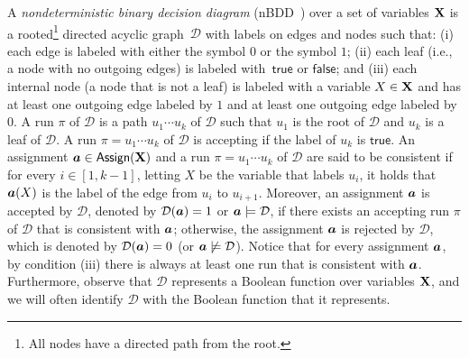 \newcommand{\true}{\mathsf{true}}
\newcommand{\false}{\mathsf{false}}
\newcommand{\D}{\mathcal{D}}

\newcommand{\nbdd}{\textsf{nBDD}\xspace}
\newcommand{\ubdd}{\textsf{uBDD}\xspace}
\newcommand{\bdd}{\textsf{BDD}\xspace}

\newcommand{\nfbdd}{\textsf{nFBDD}\xspace}
\newcommand{\nobdd}{\textsf{nOBDD}\xspace}

\newcommand{\ndt}{\textsf{nDT}\xspace}

\newcommand{\ufbdd}{\textsf{uFBDD}\xspace}
\newcommand{\uobdd}{\textsf{uOBDD}\xspace}

\newcommand{\fbdd}{\textsf{FBDD}\xspace}
\newcommand{\obdd}{\textsf{OBDD}\xspace}

\newcommand{\udt}{\textsf{uDT}\xspace}
\newcommand{\ddt}{\textsf{DT}\xspace}

\newcommand{\nodt}{\textsf{nODT}\xspace}
\newcommand{\uodt}{\textsf{uODT}\xspace}
\newcommand{\odt}{\textsf{ODT}\xspace}




A \emph{nondeterministic binary decision
diagram} (\nbdd~\citep{BW97,ACMS20}) over  a
set of variables $\mathbf{X}$ is a rooted\footnote{All nodes have a directed path from the root.} directed
acyclic graph~$\D$ with labels on edges and
nodes such that: (i) each
edge is labeled with either the symbol $0$ or
the symbol $1$; (ii) each leaf (i.e., a node
with no outgoing edges) is labeled
with~$\true$ or $\false$; and (iii) each internal
node (a node that is not a leaf) is labeled
with a variable $X \in \mathbf{X}$ and has at least one outgoing edge labeled by $1$ and at least one outgoing edge labeled by $0$. A run $\pi$ of $\D$ is a path
$u_1 \cdots u_k$ of $\D$ such that $u_1$ is
the root of $\D$ and $u_k$ is a leaf of $\D$.
A run $\pi = u_1 \cdots u_k$ of $\D$ is
accepting if the label of $u_k$ is $\true$. An
assignment $\boldsymbol{a} \in \mathsf{Assign}(\mathbf{X})$ and a run
$\pi = u_1 \cdots u_k$ of $\D$ are said to be
consistent if for every $i \in [1, k-1]$, letting $X$ be the variable that labels $u_i$, it
holds that $\boldsymbol{a}(X)$ is the label of the edge
from $u_i$ to $u_{i+1}$. Moreover, an
assignment $\boldsymbol{a}$ is accepted by $\D$, denoted
by $\D(\as) = 1$ or $\as \models \D$, if there exists an accepting
run $\pi$ of $\D$ that is consistent with $\boldsymbol{a}$; otherwise, the
assignment $\boldsymbol{a}$ is rejected by $\D$, which is
denoted by $\D(\as) = 0$ (or $\as \not\models \D$). Notice that for every assignment $\boldsymbol{a}$, by condition (iii) there is always at least one run that is consistent with $\boldsymbol{a}$. Furthermore, observe that $\D$ represents a Boolean function over variables $\mathbf{X}$, and we will often identify $\D$ with the Boolean function that it represents. 


